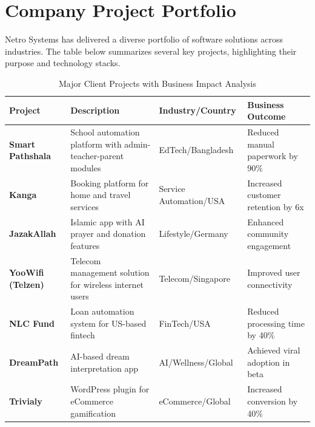 \documentclass[12pt,a4paper]{report}
\newcommand{\tableheaderrow}{\rowcolor{tableheader}}
\newcommand{\tablealtrow}{\rowcolor{tablealt1}}
\newcommand{\project}[1]{\textcolor{projectcolor}{\textbf{#1}}}
\begin{document}
\newpage
\section{Company Project Portfolio}
Netro Systems has delivered a diverse portfolio of software solutions across industries. The table below summarizes several key projects, highlighting their purpose and technology stacks.

\begin{table}[h!]
\centering
\caption{Major Client Projects with Business Impact Analysis}
\label{tab:major_projects}
\begin{tabular}{p{2.2cm} p{5cm} p{3.5cm} p{3.8cm}}
\toprule
\tableheaderrow \textcolor{headertext}{\textbf{Project}} & \textcolor{headertext}{\textbf{Description}} & \textcolor{headertext}{\textbf{Industry/Country}}  & \textcolor{headertext}{\textbf{Business Outcome}} \\
\midrule
\tablealtrow \project{Smart Pathshala} & School automation platform with admin-teacher-parent modules & EdTech/Bangladesh & Reduced manual paperwork by 90\% \\
\project{Kanga} & Booking platform for home and travel services & Service Automation/USA & Increased customer retention by 6x \\
\tablealtrow \project{JazakAllah} & Islamic app with AI prayer and donation features & Lifestyle/Germany & Enhanced community engagement \\
\project{YooWifi (Telzen)} & Telecom management solution for wireless internet users & Telecom/Singapore & Improved user connectivity \\
\tablealtrow \project{NLC Fund} & Loan automation system for US-based fintech & FinTech/USA & Reduced processing time by 40\% \\
\project{DreamPath} & AI-based dream interpretation app & AI/Wellness/Global & Achieved viral adoption in beta \\
\tablealtrow \project{Trivialy} & WordPress plugin for eCommerce gamification & eCommerce/Global & Increased conversion by 40\% \\
\bottomrule
\end{tabular}
\end{table}
\end{document}
